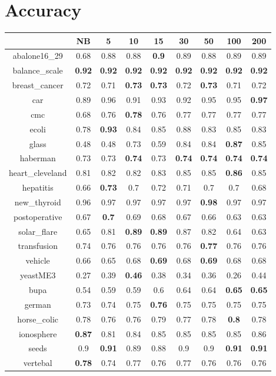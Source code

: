 \documentclass{article}%
\begin{document}
%
\normalsize%
\section*{Accuracy}%
\begin{tabular}{c|cccccccc}%
\hline%
&NB&5&10&15&30&50&100&200\\%
\hline%
abalone16\_29&0.68&0.88&0.88&\textbf{0.9}&0.89&0.88&0.89&0.89\\%
\hline%
balance\_scale&\textbf{0.92}&\textbf{0.92}&\textbf{0.92}&\textbf{0.92}&\textbf{0.92}&\textbf{0.92}&\textbf{0.92}&\textbf{0.92}\\%
\hline%
breast\_cancer&0.72&0.71&\textbf{0.73}&\textbf{0.73}&0.72&\textbf{0.73}&0.71&0.72\\%
\hline%
car&0.89&0.96&0.91&0.93&0.92&0.95&0.95&\textbf{0.97}\\%
\hline%
cmc&0.68&0.76&\textbf{0.78}&0.76&0.77&0.77&0.77&0.77\\%
\hline%
ecoli&0.78&\textbf{0.93}&0.84&0.85&0.88&0.83&0.85&0.83\\%
\hline%
glass&0.48&0.48&0.73&0.59&0.84&0.84&\textbf{0.87}&0.85\\%
\hline%
haberman&0.73&0.73&\textbf{0.74}&0.73&\textbf{0.74}&\textbf{0.74}&\textbf{0.74}&\textbf{0.74}\\%
\hline%
heart\_cleveland&0.81&0.82&0.82&0.83&0.85&0.85&\textbf{0.86}&0.85\\%
\hline%
hepatitis&0.66&\textbf{0.73}&0.7&0.72&0.71&0.7&0.7&0.68\\%
\hline%
new\_thyroid&0.96&0.97&0.97&0.97&0.97&\textbf{0.98}&0.97&0.97\\%
\hline%
postoperative&0.67&\textbf{0.7}&0.69&0.68&0.67&0.66&0.63&0.63\\%
\hline%
solar\_flare&0.65&0.81&\textbf{0.89}&\textbf{0.89}&0.87&0.82&0.64&0.63\\%
\hline%
transfusion&0.74&0.76&0.76&0.76&0.76&\textbf{0.77}&0.76&0.76\\%
\hline%
vehicle&0.66&0.65&0.68&\textbf{0.69}&0.68&\textbf{0.69}&0.68&0.68\\%
\hline%
yeastME3&0.27&0.39&\textbf{0.46}&0.38&0.34&0.36&0.26&0.44\\%
\hline%
bupa&0.54&0.59&0.59&0.6&0.64&0.64&\textbf{0.65}&\textbf{0.65}\\%
\hline%
german&0.73&0.74&0.75&\textbf{0.76}&0.75&0.75&0.75&0.75\\%
\hline%
horse\_colic&0.78&0.76&0.76&0.79&0.77&0.78&\textbf{0.8}&0.78\\%
\hline%
ionosphere&\textbf{0.87}&0.81&0.84&0.85&0.85&0.85&0.85&0.86\\%
\hline%
seeds&0.9&\textbf{0.91}&0.89&0.88&0.9&0.9&\textbf{0.91}&\textbf{0.91}\\%
\hline%
vertebal&\textbf{0.78}&0.74&0.77&0.76&0.77&0.76&0.76&0.76\\%
\hline%
\end{tabular}
\end{document}
